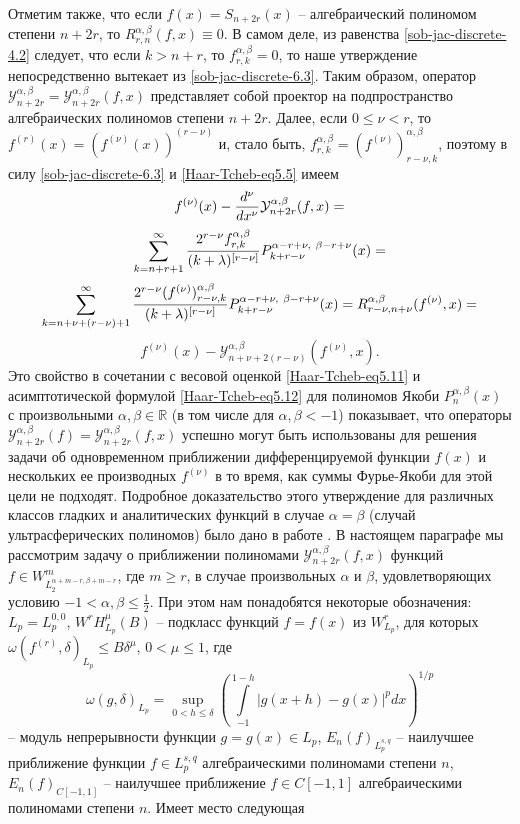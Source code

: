 Отметим также, что если $f(x)=S_{n+2r}(x)$ --  алгебраический полиномом степени $n+2r$, то $R_{r,n}^{\alpha, \beta } (f,x)\equiv0$. В самом деле, из равенства \eqref{sob-jac-discrete-4.2} следует, что если $k>n+r$, то  $f_{r,k} ^{\alpha, \beta}=0$, то наше утверждение непосредственно вытекает из \eqref{sob-jac-discrete-6.3}. Таким образом, оператор $\mathcal{Y}_{n+2r}^{\alpha, \beta}=\mathcal{Y}_{n+2r}^{\alpha, \beta}(f,x)$ представляет собой проектор на подпространство алгебраических полиномов степени $n+2r$. Далее, если $0\le\nu<r$, то $f^{(r)}(x)=\left(f^{(\nu )}(x)\right)^{(r-\nu)}$ и, стало быть, $ f _{r,k} ^ {\alpha, \beta}= (f^{(\nu)}) _{r-\nu,k} ^ {\alpha, \beta}$, поэтому в силу \eqref{sob-jac-discrete-6.3} и \eqref{Haar-Tcheb-eq5.5} имеем
$$
f^{(\nu)} (x) -{d^\nu \over dx^\nu}\mathcal{Y}_{n+2r}^{\alpha,
\beta}(f,x)=
$$
$$
\sum_{k=n+r+1}^\infty{2^{r-\nu} f _{r,k} ^ {\alpha, \beta} \over
(k+\lambda)^{[r-\nu]} }P_{k+r-\nu}^{\alpha -r+\nu, \ \beta -r+\nu}
(x)=
$$
$$
\sum_{k=n+\nu+(r-\nu)+1}^\infty{2^{r-\nu} (f^{(\nu)}) _{r-\nu,k} ^ {\alpha, \beta} \over
(k+\lambda)^{[r-\nu]} }P_{k+r-\nu}^{\alpha -r+\nu, \ \beta -r+\nu}
(x)=R_{r-\nu, n+\nu}^{\alpha, \beta}(f^{(\nu)},x)=
$$
\begin{equation}\label{sob-jac-discrete-6.4}
f^{(\nu)}(x)-\mathcal{Y}_{n+\nu +2(r-\nu)}^{\alpha,\beta}(f^{(\nu)},x).
\end{equation}
Это свойство в сочетании с весовой оценкой \eqref{Haar-Tcheb-eq5.11} и асимптотической формулой \eqref{Haar-Tcheb-eq5.12} для полиномов Якоби
$P_n^{\alpha,\beta}(x)$ с произвольными $\alpha,\beta \in \mathbb{R}$ (в том числе для
$\alpha,\beta<-1$) показывает, что операторы $\mathcal{Y}_{n+2r}^{\alpha,
\beta}(f)=\mathcal{Y}_{n+2r}^{\alpha, \beta}(f,x)$ успешно могут быть
использованы для решения задачи об одновременном приближении
дифференцируемой функции $f(x) $ и нескольких ее производных
$f^{(\nu)} $ в то время, как суммы Фурье-Якоби для этой цели не
подходят. Подробное доказательство этого утверждение для различных
классов гладких и аналитических функций в случае $\alpha= \beta $
(случай ультрасферических полиномов) было дано в работе \cite{sob-jac-discrete-Shar17}.
В настоящем параграфе мы рассмотрим  задачу о приближении
полиномами $\mathcal{Y}_{n+2r}^{\alpha,\beta}(f,x)$ функций
$f\in W_{L_2^{\alpha+m-r,\beta+m-r}}^m$, где $m\ge r$, в случае произвольных $\alpha$ и $\beta$, удовлетворяющих условию
$-1<\alpha,\beta\le \frac12$. При этом нам понадобятся
некоторые обозначения: ${L}_p={L}_p^{0,0}$,
$W^rH_{{L}_p}^\mu(B)$ -- подкласс функций   $f=f(x)$ из $W^r_{{L}_p}$, для которых
$\omega(f^{(r)},\delta)_{{L}_p}\le B\delta^\mu$, $0<\mu\le1$, где
     $$
 \omega(g,\delta)_{{L}_p}=\sup_{0<h\le\delta}
\left(\int\limits_{-1}^{1-h}|g(x+h)-g(x)|^pdx\right)^{1/p}
     $$
 -- модуль непрерывности функции $g=g(x)\in {L}_p$, $E_n(f)_{{L}_p^{s,q}}$   -- наилучшее приближение функции
$f\in {L}_p^{s,q}$ алгебраическими полиномами степени $n$, $E_n(f)_{C[-1,1]}$ --  наилучшее приближение $f\in C[-1,1]$
 алгебраическими полиномами  степени $n$. Имеет место следующая

